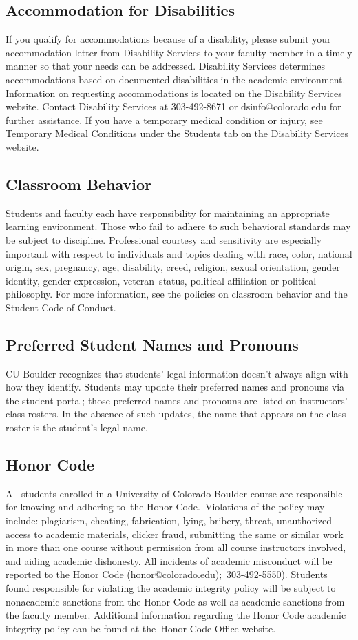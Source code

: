 \documentclass[9pt]{article}
\begin{document}
{\small


\subsection*{Accommodation for Disabilities}
If you qualify for accommodations because of a disability, please submit your accommodation letter from Disability Services to your faculty member in a timely manner so that your needs can be addressed.  Disability Services determines accommodations based on documented disabilities in the academic environment.  Information on requesting accommodations is located on the Disability Services website. Contact Disability Services at 303-492-8671 or dsinfo@colorado.edu for further assistance.  If you have a temporary medical condition or injury, see Temporary Medical Conditions under the Students tab on the Disability Services website.

\subsection*{Classroom Behavior}
Students and faculty each have responsibility for maintaining an appropriate learning environment. Those who fail to adhere to such behavioral standards may be subject to discipline. Professional courtesy and sensitivity are especially important with respect to individuals and topics dealing with race, color, national origin, sex, pregnancy, age, disability, creed, religion, sexual orientation, gender identity, gender expression, veteran status, political affiliation or political philosophy.  For more information, see the policies on classroom behavior and the Student Code of Conduct.
\subsection*{Preferred Student Names and Pronouns}
CU Boulder recognizes that students' legal information doesn't always align with how they identify. Students may update their preferred names and pronouns via the student portal; those preferred names and pronouns are listed on instructors' class rosters. In the absence of such updates, the name that appears on the class roster is the student's legal name.
\subsection*{Honor Code}
All students enrolled in a University of Colorado Boulder course are responsible for knowing and adhering to the Honor Code. Violations of the policy may include: plagiarism, cheating, fabrication, lying, bribery, threat, unauthorized access to academic materials, clicker fraud, submitting the same or similar work in more than one course without permission from all course instructors involved, and aiding academic dishonesty. All incidents of academic misconduct will be reported to the Honor Code (honor@colorado.edu); 303-492-5550). Students found responsible for violating the academic integrity policy will be subject to nonacademic sanctions from the Honor Code as well as academic sanctions from the faculty member. Additional information regarding the Honor Code academic integrity policy can be found at the Honor Code Office website.

}
\end{document}
